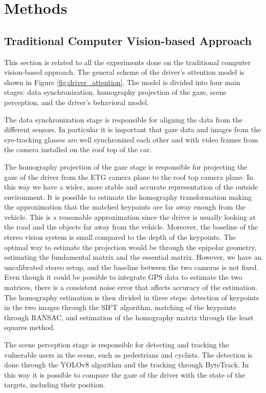 \chapter{Methods}

\section{Traditional Computer Vision-based Approach}

This section is related to all the experiments done on the traditional computer 
vision-based approach. The general scheme of the driver's attention model is 
shown in Figure \ref{fig:driver_attention}. 
The model is divided into four main stages: data synchronization, homography 
projection of the gaze, scene perception, and the driver's behavioral model. 

The data synchronization stage is responsible for aligning the data from the 
different sensors. In particular it is important that gaze data and 
images from the 
eye-tracking glasses are well synchronized each other and with video frames 
from the camera installed on the roof top of the car.

The homography projection of the gaze stage is responsible for projecting the 
gaze of the driver from the ETG camera plane to the roof top camera plane.
In this way we have a wider, more stable and accurate representation of 
the outside environment.
It is possible to 
estimate the homography transformation making the approximation that the matched 
keypoints are far away enough from the vehicle. This is a reasonable 
approximation since the driver is usually looking at the road and the objects 
far away from the vehicle. Moreover, the baseline of the stereo vision system is 
small compared to the depth of the keypoints.
The optimal way to estimate the projection would be through the epipolar 
geometry, estimating the fundamental matrix and the essential matrix. 
However, we have an uncalibrated stereo setup, and the baseline between the two 
cameras is not fixed. Even though it could be possible to integrate GPS data 
to estimate the two matrices, there is a consistent noise error that affects 
accuracy of the estimation.
The homography estimation is then divided in three steps: detection of keypoints 
in the two images through the SIFT algorithm, matching of the keypoints through 
RANSAC, and estimation of the homography matrix through the least squares method.

The scene perception stage is responsible for detecting and tracking the vulnerable 
users in the scene, such as pedestrians and cyclists. The detection is done 
through the YOLOv8 algorithm and the tracking through ByteTrack. In this way 
it is possible to compare the gaze of the driver with the state of the targets, 
including their position.

